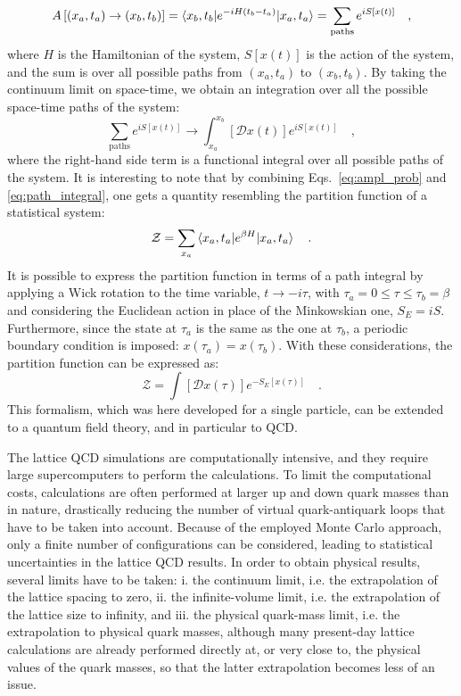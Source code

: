 \begin{equation}\label{eq:ampl_prob}
  A \left[(x_a,t_a) \rightarrow (x_b,t_b) \right] = \braket{x_b,t_b | e^{-iH(t_b-t_a)} | x_a,t_a} = \sum_\mathrm{paths} e^{iS[x(t)]}\quad , 
\end{equation}
where $H$ is the Hamiltonian of the system, $S[x(t)]$ is the action of the system, and the sum is over all possible paths from $(x_a,t_a)$ to $(x_b,t_b)$. By taking the continuum limit on space-time, we obtain an integration over all the possible space-time paths of the system:
\begin{equation}\label{eq:path_integral}
  \sum_\mathrm{paths} e^{iS[x(t)]} \rightarrow \int_{x_a}^{x_b} \left[\mathcal{D}x(t)\right] e^{iS[x(t)]}\quad ,
\end{equation}
where the right-hand side term is a functional integral over all possible paths of the system. It is interesting to note that by combining Eqs.~\ref{eq:ampl_prob} and \ref{eq:path_integral}, one gets a quantity resembling the partition function of a statistical system:
\begin{equation*}
  \mathcal{Z} = \sum_{x_a} \braket{x_a,t_a | e^{\beta H} | x_a,t_a}\quad .
\end{equation*}
It is possible to express the partition function in terms of a path integral by applying a Wick rotation to the time variable, $t \rightarrow -i\tau$, with $\tau_a=0\leq\tau\leq\tau_b=\beta$ and considering the Euclidean action in place of the Minkowskian one, $S_E = iS$. Furthermore, since the state at $\tau_a$ is the same as the one at $\tau_b$, a periodic boundary condition is imposed: $x(\tau_a) = x(\tau_b)$. With these considerations, the partition function can be expressed as:
\begin{equation*}
  \mathcal{Z} = \int \left[\mathcal{D}x(\tau)\right] e^{-S_E[x(\tau)]}\quad .
\end{equation*}
This formalism, which was here developed for a single particle, can be extended to a quantum field theory, and in particular to QCD.

The lattice QCD simulations are computationally intensive, and they require large supercomputers to perform the calculations. To limit the computational costs, calculations are often performed at larger up and down quark masses than in nature, drastically reducing the number of virtual quark-antiquark loops that have to be taken into account. Because of the employed Monte Carlo approach, only a finite number of configurations can be considered, leading to statistical uncertainties in the lattice QCD results. In order to obtain physical results, several limits have to be taken: i. the continuum limit, i.e. the extrapolation of the lattice spacing to zero, ii. the infinite-volume limit, i.e. the extrapolation of the lattice size to infinity, and iii. the physical quark-mass limit, i.e. the extrapolation to physical quark masses, although many present-day lattice calculations are already performed directly at, or very close to, the physical values of the quark masses, so that the latter extrapolation becomes less of an issue. 

